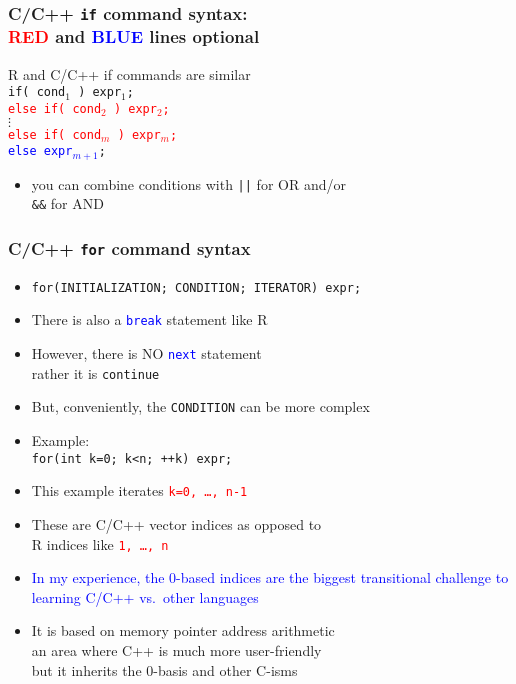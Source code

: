 \documentclass[11pt,pdftex,dvipsnames,usenames,helvetica]{beamer}
\begin{document}
\begin{frame}[fragile] 
\frametitle{C/C++ {\tt if} command syntax:\\  \textcolor{red}{RED} and
\textcolor{blue}{BLUE} lines optional}
R and C/C++ if commands are similar\\
{\tt if( cond$_1$ ) expr$_1$; \\
\textcolor{red}{else if( cond$_2$ ) expr$_2$;} \\
$\vdots$ \\
\textcolor{red}{else if( cond$_m$ ) expr$_{m}$;} \\
\textcolor{blue}{else expr$_{m+1}$};}
\begin{itemize}
\item you can combine conditions with {\tt ||} for OR
and/or\\ {\tt \&\&} for AND
\end{itemize}
\end{frame}

\begin{frame}[fragile]
\frametitle{C/C++ {\tt for} command syntax}
\begin{itemize}
\item {\tt for(INITIALIZATION; CONDITION; ITERATOR) expr;}
\item There is also a \textcolor{blue}{\tt break} statement like R
\item However, there is NO \textcolor{blue}{\tt next} statement\\
rather it is {\tt continue}
\item But, conveniently, the {\tt CONDITION} can be more complex 
\item Example:\\
{\tt for(int k=0; k<n; ++k) expr;}
\item This example iterates \textcolor{red}{\tt k=0, \dots, n-1}
\item These are C/C++ vector indices as opposed to\\
R indices like \textcolor{red}{\tt 1, \dots, n}
\item \textcolor{blue}{In my experience, the 0-based indices are the
    biggest transitional challenge to learning C/C++ vs.\ other
    languages}
\item It is based on memory pointer address arithmetic\\
an area where C++ is much more user-friendly\\
but it inherits the 0-basis and other C-isms
\end{itemize}
\end{frame}
\end{document}
